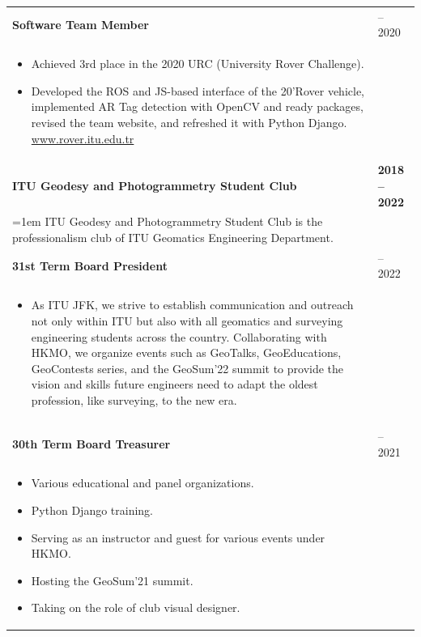 \documentclass[10pt,a4paper]{article}
\begin{document}
\begin{longtable}{@{} p{} | >{\centering\arraybackslash}p{} @{}}
  \vspace{-5pt}
  \quad \textbf{\color{cvblue}Software Team Member} & 2019 -- 2020 \\ [-5pt]
  \begin{itemize}
    \item Achieved 3rd place in the 2020 URC (University Rover Challenge).
    \item Developed the ROS and JS-based interface of the 20'Rover vehicle, implemented AR Tag detection with OpenCV and ready packages, revised the team website, and refreshed it with Python Django. \href{http://www.rover.itu.edu.tr}{www.rover.itu.edu.tr}
  \end{itemize} & \\ [10pt]

  \vspace{-2pt}
  \textbf{ITU Geodesy and Photogrammetry Student Club} & \textbf{2018 -- 2022} \\ [5pt]
  {\leftskip=1em ITU Geodesy and Photogrammetry Student Club is the professionalism club of ITU Geomatics Engineering Department.\par} & \\ [5pt]

  \vspace{-5pt}
  \quad \textbf{\color{cvblue}31st Term Board President} & 2021 -- 2022 \\ [-5pt]
  \begin{itemize}
    \item As ITU JFK, we strive to establish communication and outreach not only within ITU but also with all geomatics and surveying engineering students across the country. Collaborating with HKMO, we organize events such as GeoTalks, GeoEducations, GeoContests series, and the GeoSum'22 summit to provide the vision and skills future engineers need to adapt the oldest profession, like surveying, to the new era.
  \end{itemize} & \\ [10pt]

  \vspace{-5pt}\\
  \quad \textbf{\color{cvblue}30th Term Board Treasurer} & 2020 -- 2021 \\ [-5pt]
  \begin{itemize}
    \item Various educational and panel organizations.
    \item Python Django training.
    \item Serving as an instructor and guest for various events under HKMO.
    \item Hosting the GeoSum'21 summit.
    \item Taking on the role of club visual designer.
  \end{itemize} & \\ [10pt]


\end{longtable}
\end{document}
